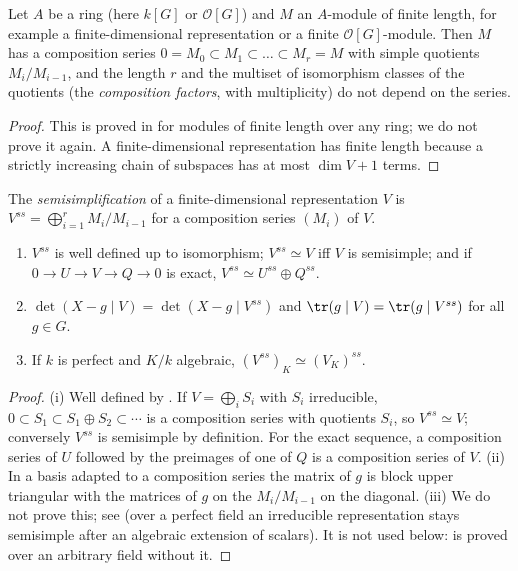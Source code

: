 \begin{theorem}\label{thm:reps:jordan-holder}
Let $A$ be a ring (here $k[G]$ or $\mathcal{O}[G]$) and $M$ an $A$-module of finite length, for example a finite-dimensional representation or a
finite $\mathcal{O}[G]$-module. Then $M$ has a composition series $0=M_0\subset M_1\subset\dots\subset M_r=M$ with simple quotients $M_i/M_{i-1}$, and the
length $r$ and the multiset of isomorphism classes of the quotients (the \emph{composition factors}, with multiplicity) do not depend
on the series.
\end{theorem}

\begin{proof}
This is proved in  for modules of finite length over any ring; we do not prove it again. A
finite-dimensional representation has finite length because a strictly increasing chain of subspaces has at most $\dim V+1$ terms.
\end{proof}

\begin{definition}\label{def:reps:semisimplification}
The \emph{semisimplification} of a finite-dimensional representation $V$ is $V^{ss}=\bigoplus_{i=1}^rM_i/M_{i-1}$ for a composition series
$(M_i)$ of $V$.
\end{definition}

\begin{proposition}\label{prop:reps:semisimplification}
\begin{enumerate}[label=(\roman*)]
\item $V^{ss}$ is well defined up to isomorphism; $V^{ss}\simeq V$ iff $V$ is semisimple; and if $0\to U\to V\to Q\to0$ is exact, $V^{ss}\simeq U^{ss}\oplus Q^{ss}$.
\item $\det(X-g\mid V)=\det(X-g\mid V^{ss})$ and $\tr(g\mid V)=\tr(g\mid V^{ss})$ for all $g\in G$.
\item If $k$ is perfect and $K/k$ algebraic, $(V^{ss})_K\simeq(V_K)^{ss}$.
\end{enumerate}
\end{proposition}

\begin{proof}
(i) Well defined by . If $V=\bigoplus_iS_i$ with $S_i$ irreducible, $0\subset S_1\subset S_1\oplus S_2\subset\cdots$ is a
composition series with quotients $S_i$, so $V^{ss}\simeq V$; conversely $V^{ss}$ is semisimple by definition. For the exact sequence, a
composition series of $U$ followed by the preimages of one of $Q$ is a composition series of $V$.
(ii) In a basis adapted to a composition series the matrix of $g$ is block upper triangular with the matrices of $g$ on the
$M_i/M_{i-1}$ on the diagonal.
(iii) We do not prove this; see \cite[Section 29]{CurtisReiner} (over a perfect field an irreducible representation stays semisimple
after an algebraic extension of scalars). It is not used below:  is proved over an arbitrary field
without it.
\end{proof}

